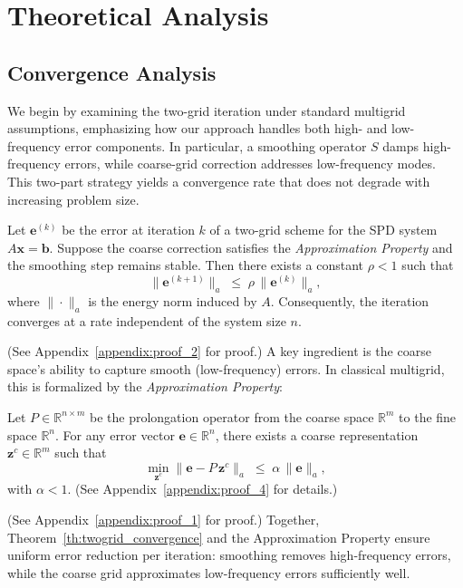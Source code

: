 \section{Theoretical Analysis}

\subsection{Convergence Analysis}
We begin by examining the two-grid iteration under standard multigrid assumptions, emphasizing how our approach handles both high- and low-frequency error components. In particular, a smoothing operator \(S\) damps high-frequency errors, while coarse-grid correction addresses low-frequency modes. This two-part strategy yields a convergence rate that does not degrade with increasing problem size.

\begin{theorem}
\label{th:twogrid_convergence}
Let \(\mathbf{e}^{(k)}\) be the error at iteration \(k\) of a two-grid scheme for the SPD system \(A\mathbf{x}=\mathbf{b}\). Suppose the coarse correction satisfies the \emph{Approximation Property} and the smoothing step remains stable. Then there exists a constant \(\rho < 1\) such that
\[
    \|\mathbf{e}^{(k+1)}\|_{a}
    \;\le\;
    \rho\,\|\mathbf{e}^{(k)}\|_{a},
\]
where \(\|\cdot\|_{a}\) is the energy norm induced by \(A\). Consequently, the iteration converges at a rate independent of the system size \(n\).
\end{theorem}

\noindent
(See Appendix~\ref{appendix:proof_2} for proof.) A key ingredient is the coarse space’s ability to capture smooth (low-frequency) errors. In classical multigrid, this is formalized by the \emph{Approximation Property}:

\begin{property}
\label{prop:approximation}
Let \(P\in\mathbb{R}^{n\times m}\) be the prolongation operator from the coarse space \(\mathbb{R}^m\) to the fine space \(\mathbb{R}^n\). For any error vector \(\mathbf{e}\in \mathbb{R}^n\), there exists a coarse representation \(\mathbf{z}^c \in \mathbb{R}^m\) such that
\[
    \min_{\mathbf{z}^c}
    \|\mathbf{e} - P\,\mathbf{z}^c\|_{a}
    \;\le\;
    \alpha\,\|\mathbf{e}\|_{a},
\]
with \(\alpha < 1\). (See Appendix~\ref{appendix:proof_4} for details.) 
\end{property}

\noindent
(See Appendix~\ref{appendix:proof_1} for proof.) Together, Theorem~\ref{th:twogrid_convergence} and the Approximation Property ensure uniform error reduction per iteration: smoothing removes high-frequency errors, while the coarse grid approximates low-frequency errors sufficiently well.

